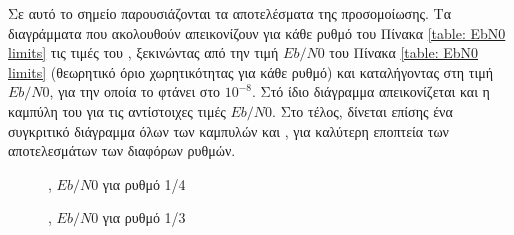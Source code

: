 Σε αυτό το σημείο παρουσιάζονται τα αποτελέσματα της προσομοίωσης. Τα διαγράμματα που ακολουθούν απεικονίζουν για κάθε ρυθμό του Πίνακα \ref{table: EbN0 limits} τις τιμές του , ξεκινώντας από την τιμή $Eb/N0$ του Πίνακα \ref{table: EbN0 limits} (θεωρητικό όριο χωρητικότητας για κάθε ρυθμό) και καταλήγοντας στη τιμή $Eb/N0$, για την οποία το  φτάνει στο $10^{-8}$. Στό ίδιο διάγραμμα απεικονίζεται και η καμπύλη του  για τις αντίστοιχες τιμές $Eb/N0$. Στο τέλος, δίνεται επίσης ένα συγκριτικό διάγραμμα όλων των καμπυλών  και , για καλύτερη εποπτεία των αποτελεσμάτων των διαφόρων ρυθμών.
\begin{figure}[h]
\caption{, $Eb/N0$ για ρυθμό 1/4}
\end{figure}
\begin{figure}[h]
\caption{, $Eb/N0$ για ρυθμό 1/3}
\end{figure}
